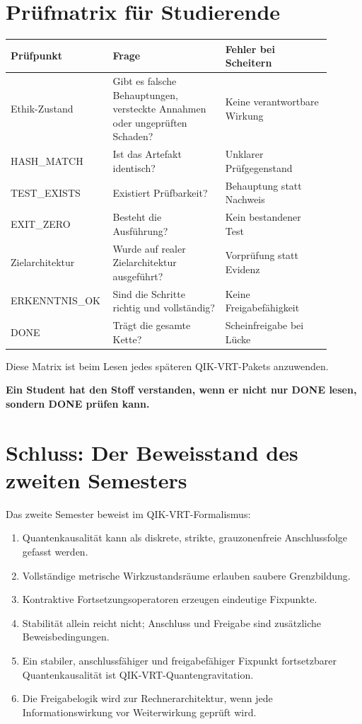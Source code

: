 \documentclass[11pt,a4paper,oneside]{scrartcl}
\theoremstyle{qikstyle}
\newenvironment{merksatz}{\begin{center}\begin{minipage}{0.92\linewidth}\sffamily\bfseries}{\end{minipage}\end{center}}
\begin{document}
\section{Prüfmatrix für Studierende}

\begin{longtable}{p{0.24\linewidth}p{0.34\linewidth}p{0.32\linewidth}}
\toprule
Prüfpunkt & Frage & Fehler bei Scheitern \\
\midrule
Ethik-Zustand & Gibt es falsche Behauptungen, versteckte Annahmen oder ungeprüften Schaden? & Keine verantwortbare Wirkung \\
HASH_MATCH & Ist das Artefakt identisch? & Unklarer Prüfgegenstand \\
TEST_EXISTS & Existiert Prüfbarkeit? & Behauptung statt Nachweis \\
EXIT_ZERO & Besteht die Ausführung? & Kein bestandener Test \\
Zielarchitektur & Wurde auf realer Zielarchitektur ausgeführt? & Vorprüfung statt Evidenz \\
ERKENNTNIS_OK & Sind die Schritte richtig und vollständig? & Keine Freigabefähigkeit \\
DONE & Trägt die gesamte Kette? & Scheinfreigabe bei Lücke \\
\bottomrule
\end{longtable}

Diese Matrix ist beim Lesen jedes späteren QIK-VRT-Pakets anzuwenden.

\begin{merksatz}
Ein Student hat den Stoff verstanden, wenn er nicht nur DONE lesen, sondern DONE prüfen kann.
\end{merksatz}
\newpage

\section{Schluss: Der Beweisstand des zweiten Semesters}

Das zweite Semester beweist im QIK-VRT-Formalismus:

\begin{enumerate}
\item Quantenkausalität kann als diskrete, strikte, grauzonenfreie Anschlussfolge gefasst werden.
\item Vollständige metrische Wirkzustandsräume erlauben saubere Grenzbildung.
\item Kontraktive Fortsetzungsoperatoren erzeugen eindeutige Fixpunkte.
\item Stabilität allein reicht nicht; Anschluss und Freigabe sind zusätzliche Beweisbedingungen.
\item Ein stabiler, anschlussfähiger und freigabefähiger Fixpunkt fortsetzbarer Quantenkausalität ist QIK-VRT-Quantengravitation.
\item Die Freigabelogik wird zur Rechnerarchitektur, wenn jede Informationswirkung vor Weiterwirkung geprüft wird.
\end{enumerate}
\end{document}
